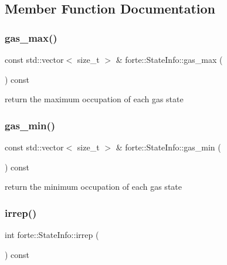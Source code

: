 \subsection{Member Function Documentation}
\mbox{\label{classforte_1_1_state_info_a7f87e4ae590b1e723fd2cab3a29673fd}} 
\subsubsection{\texorpdfstring{gas\+\_\+max()}{gas\_max()}}
{\footnotesize\ttfamily const std\+::vector$<$ size\+\_\+t $>$ \& forte\+::\+State\+Info\+::gas\+\_\+max (\begin{DoxyParamCaption}{ }\end{DoxyParamCaption}) const}



return the maximum occupation of each gas state 

\mbox{\label{classforte_1_1_state_info_afead0369c4c893b73c1e22c020358f6c}} 
\subsubsection{\texorpdfstring{gas\+\_\+min()}{gas\_min()}}
{\footnotesize\ttfamily const std\+::vector$<$ size\+\_\+t $>$ \& forte\+::\+State\+Info\+::gas\+\_\+min (\begin{DoxyParamCaption}{ }\end{DoxyParamCaption}) const}



return the minimum occupation of each gas state 

\mbox{\label{classforte_1_1_state_info_a6fc39a9719c18b179d9ab83992990e31}} 
\subsubsection{\texorpdfstring{irrep()}{irrep()}}
{\footnotesize\ttfamily int forte\+::\+State\+Info\+::irrep (\begin{DoxyParamCaption}{ }\end{DoxyParamCaption}) const}



